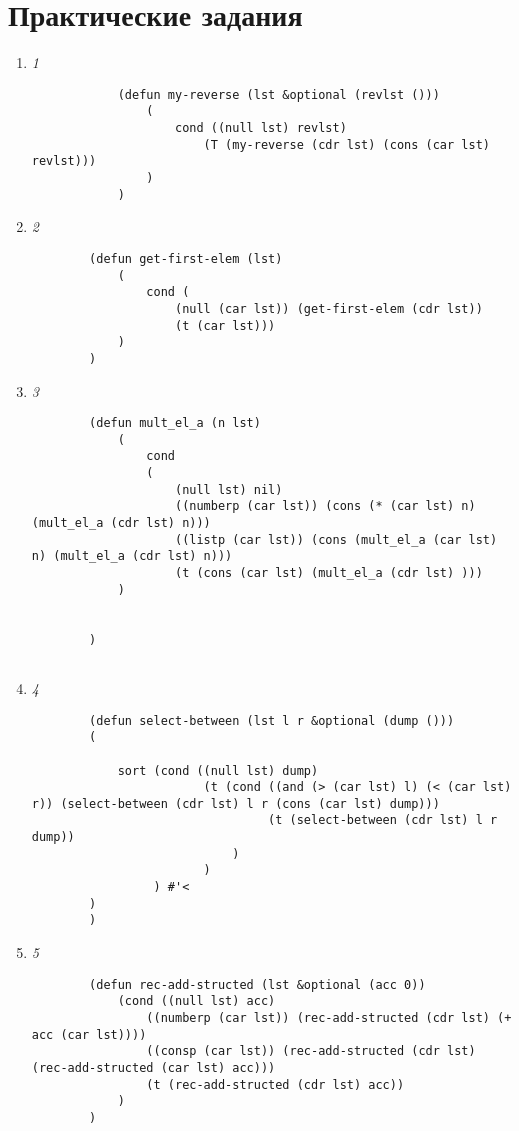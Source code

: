
\chapter{Практические задания}

\begin{enumerate}[wide=0pt]

	\item \textit{1}

		\begin{lstlisting}
			(defun my-reverse (lst &optional (revlst ()))
				(
					cond ((null lst) revlst)
						(T (my-reverse (cdr lst) (cons (car lst) revlst)))
				)
			)

		\end{lstlisting}


	\item  \textit{2}

	\begin{lstlisting}
		(defun get-first-elem (lst)
			(
				cond (  
					(null (car lst)) (get-first-elem (cdr lst))
					(t (car lst)))
			)
		)
	\end{lstlisting}

	\item  \textit{3}

	\begin{lstlisting}
		(defun mult_el_a (n lst)
			(
				cond 
				(
					(null lst) nil)
					((numberp (car lst)) (cons (* (car lst) n) (mult_el_a (cdr lst) n)))
					((listp (car lst)) (cons (mult_el_a (car lst) n) (mult_el_a (cdr lst) n)))
					(t (cons (car lst) (mult_el_a (cdr lst) )))
			)
		
		
		)   
	
	\end{lstlisting}

	\item  \textit{4}

	\begin{lstlisting}
		(defun select-between (lst l r &optional (dump ()))
		(
		
			sort (cond ((null lst) dump)
						(t (cond ((and (> (car lst) l) (< (car lst) r)) (select-between (cdr lst) l r (cons (car lst) dump)))
								 (t (select-between (cdr lst) l r dump))
							)
						)
				 ) #'<
		)
		)
	\end{lstlisting}

	\item  \textit{5}
	
	\begin{lstlisting}
		(defun rec-add-structed (lst &optional (acc 0))
			(cond ((null lst) acc)
				((numberp (car lst)) (rec-add-structed (cdr lst) (+ acc (car lst))))
				((consp (car lst)) (rec-add-structed (cdr lst) (rec-add-structed (car lst) acc)))
				(t (rec-add-structed (cdr lst) acc))
			)
		)
	
	\end{lstlisting}




\end{enumerate}
